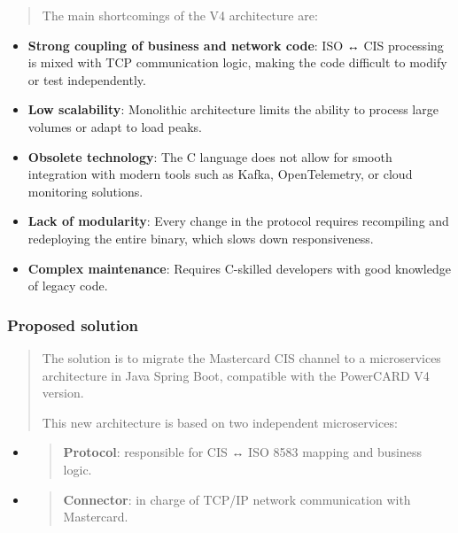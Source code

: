 \documentclass[12pt,a4paper]{report}
\begin{document}
\begin{quote}
The main shortcomings of the V4 architecture are:
\end{quote}

\begin{itemize}
\item
  \textbf{Strong coupling of business and network code}: ISO ↔ CIS
  processing is mixed with TCP communication logic, making the code
  difficult to modify or test independently.
\item
  \textbf{Low scalability}: Monolithic architecture limits the ability
  to process large volumes or adapt to load peaks.
\item
  \textbf{Obsolete technology}: The C language does not allow for smooth
  integration with modern tools such as Kafka, OpenTelemetry, or cloud
  monitoring solutions.
\item
  \textbf{Lack of modularity}: Every change in the protocol requires
  recompiling and redeploying the entire binary, which slows down
  responsiveness.
\item
  \textbf{Complex maintenance}: Requires C-skilled developers with good
  knowledge of legacy code.
\end{itemize}

\hypertarget{proposed-solution}{%
\subsubsection{\texorpdfstring{\textbf{Proposed
solution}}{Proposed solution}}\label{proposed-solution}}

\begin{quote}
The solution is to migrate the Mastercard CIS channel to a microservices
architecture in Java Spring Boot, compatible with the PowerCARD V4
version.

This new architecture is based on two independent microservices:
\end{quote}

\begin{itemize}
\item
  \begin{quote}
  \textbf{Protocol}: responsible for CIS ↔ ISO 8583 mapping and business
  logic.
  \end{quote}
\item
  \begin{quote}
  \textbf{Connector}: in charge of TCP/IP network communication with
  Mastercard.
  \end{quote}
\end{itemize}
\end{document}
